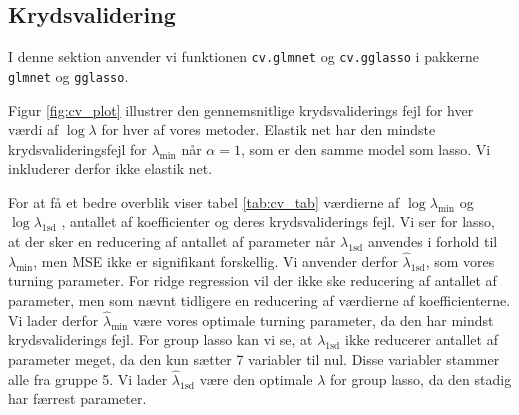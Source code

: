 \subsection{Krydsvalidering}
I denne sektion anvender vi funktionen \texttt{cv.glmnet} og \texttt{cv.gglasso} i pakkerne \texttt{glmnet} og \texttt{gglasso}. 

Figur \ref{fig:cv_plot} illustrer den gennemsnitlige krydsvaliderings fejl for hver værdi af $\log \lambda$ for hver af vores metoder. 
Elastik net har den mindste krydsvalideringsfejl for $\lambda_{\min}$  når $\alpha =1$, som er den samme model som lasso. Vi inkluderer derfor ikke elastik net. 




For at få et bedre overblik viser tabel \ref{tab:cv_tab} værdierne af $\log \lambda_{\min}$ og $\log \lambda_{1\text{sd}}$ , antallet af koefficienter og deres krydsvaliderings fejl.  
Vi ser for lasso,  at der sker en reducering af antallet af parameter når $\lambda_{1\text{sd}}$ anvendes i forhold til $\lambda_{\min}$, men MSE ikke er signifikant forskellig.  
Vi anvender derfor $\widehat{\lambda}_{1\text{sd}}$, som vores turning parameter. 
For ridge regression vil der ikke ske reducering af antallet af parameter, men som nævnt tidligere en reducering af værdierne af koefficienterne. 
Vi lader derfor $\widehat{\lambda}_{\min}$ være vores optimale turning parameter, da den har mindst krydsvaliderings fejl.
%
For group lasso kan vi se, at $\lambda_{1\text{sd}}$ ikke reducerer antallet af parameter meget, da den kun sætter 7 variabler til nul. 
Disse variabler stammer alle fra gruppe 5.
Vi lader $\widehat{\lambda}_{1\text{sd}}$ være den optimale $\lambda$ for group lasso, da den stadig har færrest parameter. 

